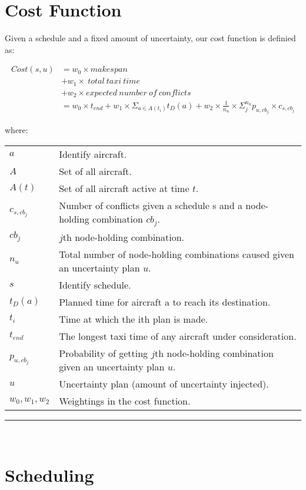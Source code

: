 \documentclass[a4paper]{article}
\makeatletter
\newenvironment{conditions}
{\par\vspace{\abovedisplayskip}\noindent\begin{tabular}{>{$}l<{$} @{${}={}$} l}}
{\end{tabular}\par\vspace{\belowdisplayskip}}
\makeatother
\begin{document}
\section{Cost Function}

Given a schedule and a fixed amount of uncertainty, our cost function is definied as:

\begin{align*}\label{eq:pareto mle2}
Cost(s, u) &= w_0 \times makespan \\
              &+ w_1 \times\ total\ taxi\ time \\
              &+ w_2 \times expected\ number\ of\ conflicts \\
              &= w_0 \times t_{end} + w_1 \times \Sigma_{a\in A(t_i)} t_D(a) + w_2 \times \frac{1}{n_u} \times \Sigma_{j}^{n_u} p_{u, cb_j} \times c_{s, cb_j}
\end{align*}

where:

\begin{conditions}
 a     &  Identify aircraft.\\
 A     &  Set of all aircraft.\\
 A(t)  &  Set of all aircraft active at time $t$.\\
 c_{s, cb_j}     &  Number of conflicts given a schedule s and a node-holding combination $cb_j$.\\
 cb_j  &  $j$th node-holding combination.\\
 n_u   &  Total number of node-holding combinations caused given an uncertainty plan $u$.\\
 s     &  Identify schedule.\\
 t_D(a) & Planned time for aircraft a to reach its destination.\\
 t_i    & Time at which the ith plan is made.\\
 t_{end}    & The longest taxi time of any aircraft under consideration.\\
 p_{u, cb_j}   &  Probability of getting $j$th node-holding combination given an uncertainty plan $u$.\\
 u     &  Uncertainty plan (amount of uncertainty injected).\\
 w_0, w_1, w_2  &  Weightings in the cost function.
\end{conditions}

\noindent\rule{\textwidth}{1pt}\\

\section{Scheduling}
\end{document}
